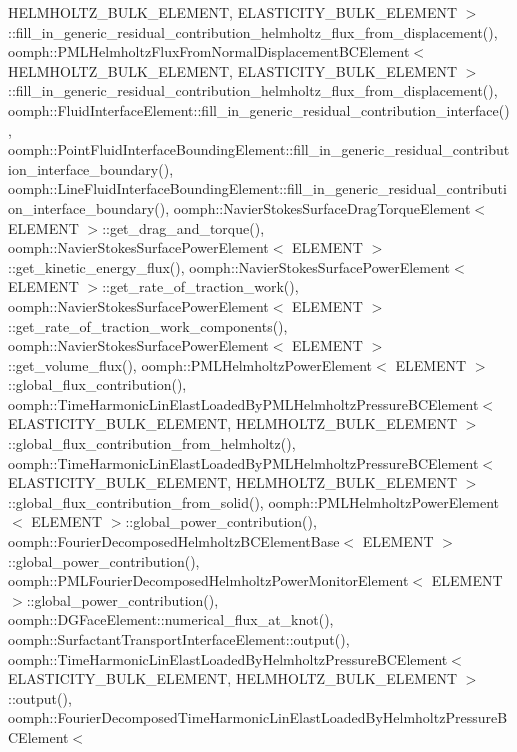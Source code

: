 H\+E\+L\+M\+H\+O\+L\+T\+Z\+\_\+\+B\+U\+L\+K\+\_\+\+E\+L\+E\+M\+E\+N\+T, E\+L\+A\+S\+T\+I\+C\+I\+T\+Y\+\_\+\+B\+U\+L\+K\+\_\+\+E\+L\+E\+M\+E\+N\+T $>$\+::fill\+\_\+in\+\_\+generic\+\_\+residual\+\_\+contribution\+\_\+helmholtz\+\_\+flux\+\_\+from\+\_\+displacement(), oomph\+::\+P\+M\+L\+Helmholtz\+Flux\+From\+Normal\+Displacement\+B\+C\+Element$<$ H\+E\+L\+M\+H\+O\+L\+T\+Z\+\_\+\+B\+U\+L\+K\+\_\+\+E\+L\+E\+M\+E\+N\+T, E\+L\+A\+S\+T\+I\+C\+I\+T\+Y\+\_\+\+B\+U\+L\+K\+\_\+\+E\+L\+E\+M\+E\+N\+T $>$\+::fill\+\_\+in\+\_\+generic\+\_\+residual\+\_\+contribution\+\_\+helmholtz\+\_\+flux\+\_\+from\+\_\+displacement(), oomph\+::\+Fluid\+Interface\+Element\+::fill\+\_\+in\+\_\+generic\+\_\+residual\+\_\+contribution\+\_\+interface(), oomph\+::\+Point\+Fluid\+Interface\+Bounding\+Element\+::fill\+\_\+in\+\_\+generic\+\_\+residual\+\_\+contribution\+\_\+interface\+\_\+boundary(), oomph\+::\+Line\+Fluid\+Interface\+Bounding\+Element\+::fill\+\_\+in\+\_\+generic\+\_\+residual\+\_\+contribution\+\_\+interface\+\_\+boundary(), oomph\+::\+Navier\+Stokes\+Surface\+Drag\+Torque\+Element$<$ E\+L\+E\+M\+E\+N\+T $>$\+::get\+\_\+drag\+\_\+and\+\_\+torque(), oomph\+::\+Navier\+Stokes\+Surface\+Power\+Element$<$ E\+L\+E\+M\+E\+N\+T $>$\+::get\+\_\+kinetic\+\_\+energy\+\_\+flux(), oomph\+::\+Navier\+Stokes\+Surface\+Power\+Element$<$ E\+L\+E\+M\+E\+N\+T $>$\+::get\+\_\+rate\+\_\+of\+\_\+traction\+\_\+work(), oomph\+::\+Navier\+Stokes\+Surface\+Power\+Element$<$ E\+L\+E\+M\+E\+N\+T $>$\+::get\+\_\+rate\+\_\+of\+\_\+traction\+\_\+work\+\_\+components(), oomph\+::\+Navier\+Stokes\+Surface\+Power\+Element$<$ E\+L\+E\+M\+E\+N\+T $>$\+::get\+\_\+volume\+\_\+flux(), oomph\+::\+P\+M\+L\+Helmholtz\+Power\+Element$<$ E\+L\+E\+M\+E\+N\+T $>$\+::global\+\_\+flux\+\_\+contribution(), oomph\+::\+Time\+Harmonic\+Lin\+Elast\+Loaded\+By\+P\+M\+L\+Helmholtz\+Pressure\+B\+C\+Element$<$ E\+L\+A\+S\+T\+I\+C\+I\+T\+Y\+\_\+\+B\+U\+L\+K\+\_\+\+E\+L\+E\+M\+E\+N\+T, H\+E\+L\+M\+H\+O\+L\+T\+Z\+\_\+\+B\+U\+L\+K\+\_\+\+E\+L\+E\+M\+E\+N\+T $>$\+::global\+\_\+flux\+\_\+contribution\+\_\+from\+\_\+helmholtz(), oomph\+::\+Time\+Harmonic\+Lin\+Elast\+Loaded\+By\+P\+M\+L\+Helmholtz\+Pressure\+B\+C\+Element$<$ E\+L\+A\+S\+T\+I\+C\+I\+T\+Y\+\_\+\+B\+U\+L\+K\+\_\+\+E\+L\+E\+M\+E\+N\+T, H\+E\+L\+M\+H\+O\+L\+T\+Z\+\_\+\+B\+U\+L\+K\+\_\+\+E\+L\+E\+M\+E\+N\+T $>$\+::global\+\_\+flux\+\_\+contribution\+\_\+from\+\_\+solid(), oomph\+::\+P\+M\+L\+Helmholtz\+Power\+Element$<$ E\+L\+E\+M\+E\+N\+T $>$\+::global\+\_\+power\+\_\+contribution(), oomph\+::\+Fourier\+Decomposed\+Helmholtz\+B\+C\+Element\+Base$<$ E\+L\+E\+M\+E\+N\+T $>$\+::global\+\_\+power\+\_\+contribution(), oomph\+::\+P\+M\+L\+Fourier\+Decomposed\+Helmholtz\+Power\+Monitor\+Element$<$ E\+L\+E\+M\+E\+N\+T $>$\+::global\+\_\+power\+\_\+contribution(), oomph\+::\+D\+G\+Face\+Element\+::numerical\+\_\+flux\+\_\+at\+\_\+knot(), oomph\+::\+Surfactant\+Transport\+Interface\+Element\+::output(), oomph\+::\+Time\+Harmonic\+Lin\+Elast\+Loaded\+By\+Helmholtz\+Pressure\+B\+C\+Element$<$ E\+L\+A\+S\+T\+I\+C\+I\+T\+Y\+\_\+\+B\+U\+L\+K\+\_\+\+E\+L\+E\+M\+E\+N\+T, H\+E\+L\+M\+H\+O\+L\+T\+Z\+\_\+\+B\+U\+L\+K\+\_\+\+E\+L\+E\+M\+E\+N\+T $>$\+::output(), oomph\+::\+Fourier\+Decomposed\+Time\+Harmonic\+Lin\+Elast\+Loaded\+By\+Helmholtz\+Pressure\+B\+C\+Element$<$ 
